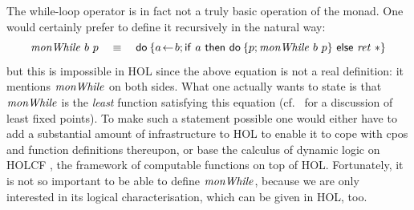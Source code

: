 \begin{rem}\label{rem:while-loop-cpo}
The while-loop operator is in fact not a truly basic operation of the
monad. One would certainly prefer to define it recursively in the natural way:
\[
\mathit{monWhile}\ b\ p\quad \equiv\quad \mathsf{do}\: \{a\!\gets\! b; \mathsf{if}\ a\ \mathsf{then}\ \mathsf{do}\: \{p;
      \mathit{monWhile}\ b\ p\}\ \mathsf{else}\ \mathit{ret}~\ast\}
\]
but this is impossible in HOL since the above equation is not a real definition:
it mentions $\mathit{monWhile}$ on both sides. What one actually wants to state is
that $\mathit{monWhile}$ is the \emph{least} function satisfying this equation
(cf.~\cite{Reynolds98} for a discussion of least fixed points). To make such a
statement possible one would either have to add a substantial amount of
infrastructure to HOL to enable it to cope with cpos and function definitions
thereupon, or base the calculus of dynamic logic on HOLCF
\cite{MuellerNipkowOheimbSlotosch}, the framework of computable functions on top
of HOL. Fortunately, it is not so important to be able to define
$\mathit{monWhile}$, because we are only interested in its logical characterisation,
which can be given in HOL, too.
\end{rem}

